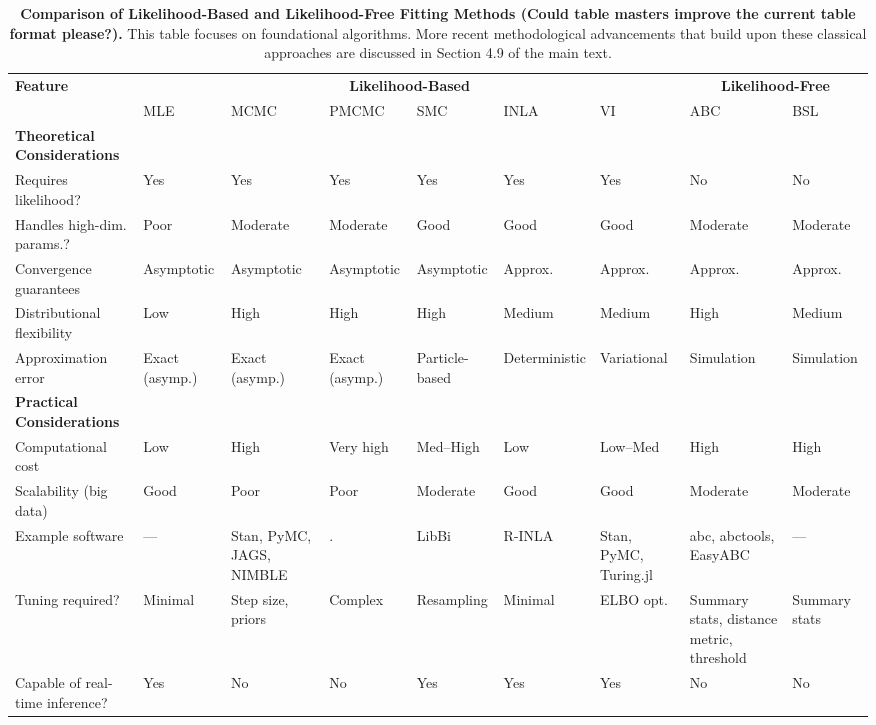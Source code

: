 \documentclass{article}
\begin{document}
\begin{landscape}
\begin{table}[ht]
\renewcommand{\arraystretch}{1.2}
\centering
\caption{\textbf{Comparison of Likelihood-Based and Likelihood-Free Fitting Methods (Could table masters improve the current table format please?).} 
This table focuses on foundational algorithms. More recent methodological advancements that build upon these classical approaches are discussed in Section 4.9 of the main text.}
\label{tab:methods_comparison}
\small
\begin{tabular}{@{}p{3.2cm}p{1.5cm}p{1.5cm}p{1.5cm}p{1.5cm}p{1.5cm}p{1.5cm}p{1.5cm}p{1.5cm}@{}}
\toprule
\multirow{2}{*}{\textbf{Feature}} & \multicolumn{6}{c}{\textbf{Likelihood-Based}} & \multicolumn{2}{c}{\textbf{Likelihood-Free}} \\
\cmidrule(lr){2-7} \cmidrule(lr){8-9}
 & MLE & MCMC & PMCMC & SMC & INLA & VI & ABC & BSL \\
\midrule
\textbf{Theoretical Considerations} & & & & & & & & \\
\midrule
Requires likelihood? & Yes & Yes & Yes & Yes & Yes & Yes & No & No \\
Handles high-dim. params.? & Poor & Moderate & Moderate & Good & Good & Good & Moderate & Moderate \\
Convergence guarantees & Asymptotic & Asymptotic & Asymptotic & Asymptotic & Approx. & Approx. & Approx. & Approx. \\
Distributional flexibility & Low & High & High & High & Medium & Medium & High & Medium \\
Approximation error & Exact (asymp.) & Exact (asymp.) & Exact (asymp.) & Particle-based & Deterministic & Variational & Simulation & Simulation \\
\midrule
\textbf{Practical Considerations} & & & & & & & & \\
\midrule
Computational cost & Low & High & Very high & Med--High & Low & Low--Med & High & High \\
Scalability (big data) & Good & Poor & Poor & Moderate & Good & Good & Moderate & Moderate \\
Example software & --- & Stan, PyMC, JAGS, NIMBLE & . & LibBi & R-INLA & Stan, PyMC, Turing.jl & abc, abctools, EasyABC & --- \\
Tuning required? & Minimal & Step size, priors & Complex & Resampling & Minimal & ELBO opt. & Summary stats, distance metric, threshold & Summary stats \\
Capable of real-time inference? & Yes & No & No & Yes & Yes & Yes & No & No \\

\end{tabular}
\end{table}
\end{landscape}
\end{document}
